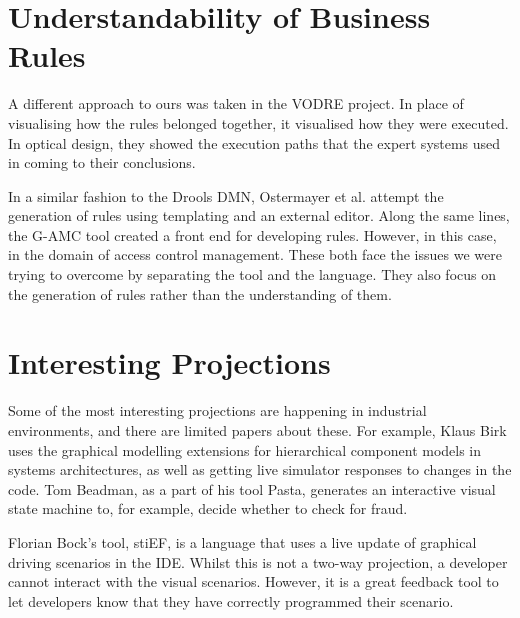\section{Understandability of Business Rules}

A different approach to ours was taken in the VODRE project\cite{lapaev2014vodre}.
In place of visualising how the rules belonged together, it visualised how they were executed.
In optical design, they showed the execution paths that the expert systems used in coming to their conclusions.

In a similar fashion to the Drools DMN, Ostermayer et al.\cite{ostermayer2013simplifying} attempt the generation of rules using templating and an external editor.
Along the same lines, the G-AMC tool\cite{sa2016g} created a front end for developing rules.
However, in this case, in the domain of access control management.
These both face the issues we were trying to overcome by separating the tool and the language. 
They also focus on the generation of rules rather than the understanding of them.

\section{Interesting Projections}
Some of the most interesting projections are happening in industrial environments, and there are limited papers about these.
For example, Klaus Birk\cite{Birken_Interactive} uses the graphical modelling extensions for hierarchical component models in systems architectures, as well as getting live simulator responses to changes in the code.
Tom Beadman\cite{Beadman_Journey}, as a part of his tool Pasta, generates an interactive visual state machine to, for example, decide whether to check for fraud. 

Florian Bock's tool, stiEF\cite{Bock_stief}, is a language that uses a live update of graphical driving scenarios in the IDE.
Whilst this is not a two-way projection, a developer cannot interact with the visual scenarios.
However, it is a great feedback tool to let developers know that they have correctly programmed their scenario. 